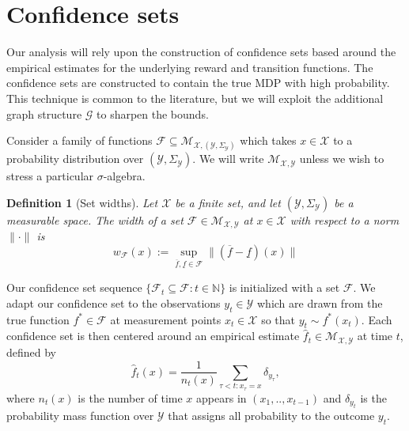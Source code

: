 \documentclass{article}
\newtheorem{mydef}{Definition}
\newcommand{\Nat}{\mathbb{N}}
\newcommand{\Xc}{\mathcal{X}}
\newcommand{\Yc}{\mathcal{Y}}
\newcommand{\Fc}{\mathcal{F}}
\newcommand{\Gc}{\mathcal{G}}
\newcommand{\Mc}{\mathcal{M}}
\begin{document}
\section{Confidence sets}
Our analysis will rely upon the construction of confidence sets based around the empirical estimates for the underlying reward and transition functions.
The confidence sets are constructed to contain the true MDP with high probability.
This technique is common to the literature, but we will exploit the additional graph structure $\Gc$ to sharpen the bounds.

Consider a family of functions $\Fc \subseteq \Mc_{\Xc,(\Yc,\Sigma_\Yc)}$ which takes $x \in \Xc$ to a probability distribution over $(\Yc, \Sigma_\Yc)$.
We will write $\Mc_{\Xc,\Yc}$ unless we wish to stress a particular $\sigma$-algebra.
\begin{mydef}[Set widths] \hspace{0.000000001mm} \newline
Let $\Xc$ be a finite set, and let $(\Yc,\Sigma_{\Yc})$ be a measurable space.  The {\it width} of a set $\Fc \in \Mc_{\Xc,\Yc}$ at $x \in \Xc$ with respect to
a norm $\|\cdot\|$ is
$$w_{\mathcal{F}}(x) := \sup_{\overline{f}, \underline{f} \in \mathcal{F}} \|(\overline{f} -  \underline{f})(x)\|$$
\end{mydef}

Our confidence set sequence $\{\Fc_t \subseteq \Fc : t \in \Nat\}$ is initialized with a set $\Fc$.
We adapt our confidence set to the observations $y_t \in \Yc$ which are drawn from the true function $f^* \in \Fc$ at measurement points $x_t \in \Xc$ so that $y_t \sim f^*(x_t)$.
Each confidence set is then centered around an empirical estimate $\hat{f}_t \in \Mc_{\Xc,\Yc}$ at time $t$, defined by
$$\hat{f}_t(x) = \frac{1}{n_t(x)} \sum_{\tau < t: x_\tau = x} \delta_{y_\tau},$$
where $n_t(x)$ is the number of time $x$ appears in $(x_1, .. ,x_{t-1})$ and $\delta_{y_t}$ is the probability mass function over $\Yc$ that assigns all probability to the outcome $y_t$.
\end{document}
